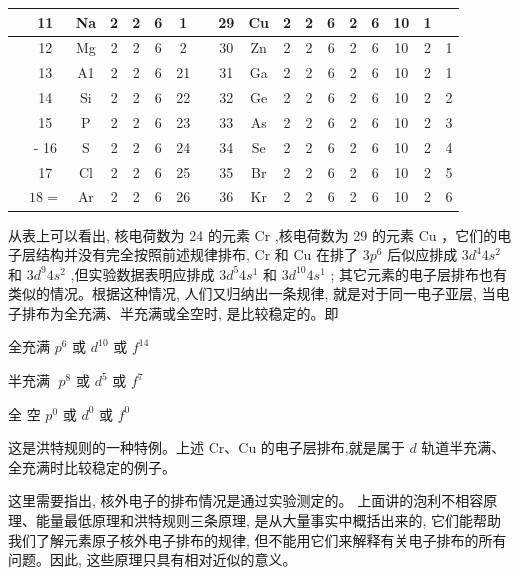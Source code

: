 \documentclass[10pt]{article}
\begin{document}
\begin{center}
{\begin{tabular}{|c|c|c|c|c|c|c|c|c|c|c|c|c|c|c|c|c|c|}
\hline
\phantom{X} & 11 & Na & 2 & 2 & 6 & 1 & \phantom{X} & 29 & Cu & 2 & 2 & 6 & 2 & 6 & 10 & 1 & \phantom{X} \\
\hline
\phantom{X} & 12 & Mg & 2 & 2 & 6 & 2 & \phantom{X} & 30 & Zn & 2 & 2 & 6 & 2 & 6 & 10 & 2 & 1 \\
\hline
\phantom{X} & 13 & A1 & 2 & 2 & 6 & 21 & \phantom{X} & 31 & Ga & 2 & 2 & 6 & 2 & 6 & 10 & 2 & 1 \\
\hline
\phantom{X} & 14 & Si & 2 & 2 & 6 & 22 & \phantom{X} & 32 & Ge & 2 & 2 & 6 & 2 & 6 & 10 & 2 & 2 \\
\hline
\phantom{X} & 15 & P & 2 & 2 & 6 & 23 & \phantom{X} & 33 & As & 2 & 2 & 6 & 2 & 6 & 10 & 2 & 3 \\
\hline
\phantom{X} & - 16 & S & 2 & 2 & 6 & 24 & \phantom{X} & 34 & Se & 2 & 2 & 6 & 2 & 6 & 10 & 2 & 4 \\
\hline
\phantom{X} & 17 & Cl & 2 & 2 & 6 & 25 & \phantom{X} & 35 & Br & 2 & 2 & 6 & 2 & 6 & 10 & 2 & 5 \\
\hline
\phantom{X} & \({18} =\) & Ar & 2 & 2 & 6 & 26 & \phantom{X} & 36 & \(\mathrm{{Kr}}\) & 2 & 2 & 6 & 2 & 6 & 10 & 2 & 6 \\
\hline
\end{tabular}
}
\end{center}

从表上可以看出, 核电荷数为 24 的元素 \(\mathrm{{Cr}}\) ,核电荷数为 29 的元素 \(\mathrm{{Cu}}\) ，它们的电子层结构并没有完全按照前述规律排布, \(\mathrm{{Cr}}\) 和 \(\mathrm{{Cu}}\) 在排了 \(3{p}^{6}\) 后似应排成 \(3{d}^{4}4{s}^{2}\) 和 \(3{d}^{9}4{s}^{2}\) ,但实验数据表明应排成 \(3{d}^{5}4{s}^{1}\) 和 \(3{d}^{10}4{s}^{1}\) ; 其它元素的电子层排布也有类似的情况。根据这种情况, 人们又归纳出一条规律, 就是对于同一电子亚层, 当电子排布为全充满、半充满或全空时, 是比较稳定的。即

全充满 \({p}^{6}\) 或 \({d}^{10}\) 或 \({f}^{14}\)

半充满 \(\;{p}^{8}\) 或 \({d}^{5}\) 或 \({f}^{7}\)

全 空 \({p}^{0}\) 或 \({d}^{0}\) 或 \({f}^{0}\)

这是洪特规则的一种特例。上述 \(\mathrm{{Cr}}\text{、}\mathrm{{Cu}}\) 的电子层排布,就是属于 \(d\) 轨道半充满、全充满时比较稳定的例子。

这里需要指出, 核外电子的排布情况是通过实验测定的。 上面讲的泡利不相容原理、能量最低原理和洪特规则三条原理, 是从大量事实中概括出来的, 它们能帮助我们了解元素原子核外电子排布的规律, 但不能用它们来解释有关电子排布的所有问题。因此, 这些原理只具有相对近似的意义。
\end{document}
